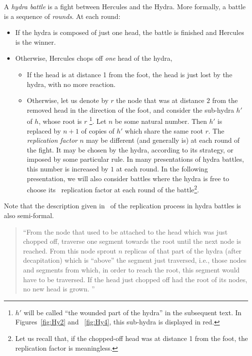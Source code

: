 A \emph{hydra battle} is a fight between Hercules and the Hydra. 
More formally, a  battle is a sequence of \emph{rounds}.
At each round:
\begin{itemize}
\item If the hydra is composed of just one head, the battle is finished
and  Hercules is the winner.
\item Otherwise, Hercules chops off \emph{one} head of the hydra,

\begin{itemize}
\item If the head is at distance 1 from the foot, the head is just lost by the hydra, with no more reaction.
\item Otherwise, let us denote by \(r\) the node that was at distance \(2\) from 
the removed head in the direction of the foot,  and consider the  sub-hydra \(h'\) of \(h\), whose  root is \(r\) \footnote{$h'$ will be called ``the wounded part of the hydra'' in the subsequent text. In Figures~\vref{fig:Hy2} and ~\vref{fig:Hy4}, this sub-hydra  is displayed in red.}. Let $n$ be some natural number.
Then $h'$ is replaced by  $n+1$ of copies of \(h'\) which share the same root $r$.
 The \emph{replication factor} $n$ may be different (and generally is)   at each round of the fight.
It may be chosen by the hydra, according to its strategy, or imposed by some 
particular rule. In many presentations of hydra battles, this number is increased by $1$ at each round. In the following presentation, we will also consider battles where the hydra is free to choose its ~replication factor at each round of the battle\footnote{Let us recall that, if the chopped-off head was at distance 1 from the foot, the replication factor is meaningless.}.
\end{itemize}
\end{itemize}



Note that the description given in~\cite{KP82} of the replication process in hydra battles is also  semi-formal. 

\label{original-rules}

\begin{quote}
  ``From the node that used to be attached to the head which was just chopped off, traverse one 
segment towards the root until the next node is reached. From this node sprout $n$ replicas of 
that part of the hydra (after decapitation) which is ``above'' the segment just traversed, i.e., those 
nodes and segments from which, in order to reach the root, this segment would have to be 
traversed. If the head just chopped off had the root of its nodes, no new head is grown. ''
\end{quote}

